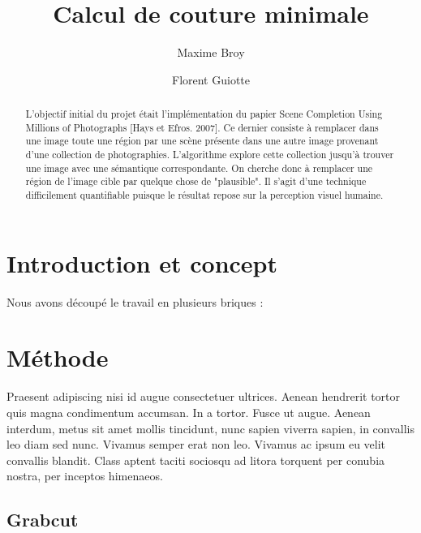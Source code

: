 \documentclass[a4paper]{article}
\title{Calcul de couture minimale}           %
\author{Maxime Broy \and Florent Guiotte}
\date{}                       %
\begin{document}
\maketitle                    %

\begin{abstract}
L'objectif initial du projet était l'implémentation du papier Scene Completion Using Millions of Photographs [Hays et Efros. 2007]. Ce dernier consiste à remplacer dans une image toute une région par une scène présente dans une autre image provenant d'une collection de photographies. L'algorithme explore cette collection jusqu'à trouver une image avec une sémantique correspondante. On cherche donc à remplacer une région de l'image cible par quelque chose de "plausible". Il s'agit d'une technique difficilement quantifiable puisque le résultat repose sur la perception visuel humaine. 
\end{abstract}



\section{Introduction et concept}               %

Nous avons découpé le travail en plusieurs briques : 

\section{Méthode}         %

Praesent adipiscing nisi id augue consectetuer ultrices. Aenean hendrerit tortor
quis magna condimentum accumsan. In a tortor. Fusce ut augue. Aenean interdum,
metus sit amet mollis tincidunt, nunc sapien viverra sapien, in convallis leo
diam sed nunc. Vivamus semper erat non leo. Vivamus ac ipsum eu velit convallis
blandit. Class aptent taciti sociosqu ad litora torquent per conubia nostra, per
inceptos himenaeos.

\subsection{Grabcut}       %
\end{document}
